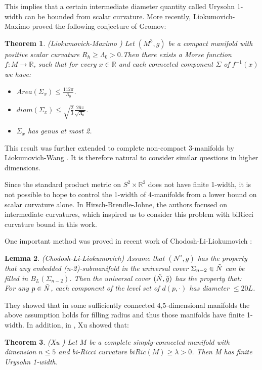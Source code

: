 \documentclass{amsart}
\newtheorem{theorem}{Theorem}[section]
\newtheorem{lemma}[theorem]{Lemma}
\theoremstyle{definition}
\theoremstyle{remark}
\numberwithin{equation}{section}
\begin{document}
This implies that a certain intermediate diameter quantity called Urysohn 1-width can be bounded from scalar curvature. More recently, Liokumovich-Maximo \cite {Yd20} proved the following conjecture of Gromov:

\begin{theorem}(Liokumovich-Maximo \cite{Yd20})
    Let $(M^{3},g)$ be a compact manifold with positive scalar curvature $R_{h}\geq\Lambda_{0}>0$.Then there exists a Morse function $f:M\to \mathbb{R}$, such that for every $x\in \mathbb{R}$ and each connected component $\Sigma$ of $f^{-1}(x)$ we have:
\begin{itemize}
    \item[(a)] $Area(\Sigma_{x})\leq \frac{112\pi}{\Lambda_{0}}$.
    \item[(b)] $diam(\Sigma_{x})\leq \sqrt{\frac{2}{3}}\frac{26\pi}{\sqrt{\Lambda_{0}}}$.

    \item[(c)] $\Sigma_{x}$ has genus at most 2. 
\end{itemize}

\end{theorem}
This result was further extended to complete non-compact 3-manifolds by Lioku\-movich-Wang \cite{lw23}. It is therefore natural to consider  similar questions in higher dimensions.

Since the standard product metric on $S^{2}\times \mathbb{R}^{2}$ does not have finite 1-width, it is not possible to hope to control the 1-width of 4-manifolds from a lower bound on scalar curvature alone. In Hirsch-Brendle-Johne\cite{ssa22}, the authors focused on intermediate curvatures, which inspired us to consider this problem with biRicci curvature bound in this work. 

One important method was proved in recent work of Chodosh-Li-Liokumovich \cite{cll23} :
\begin{lemma}(Chodosh-Li-Liokumovich\cite{cll23})
Assume that $(N^{n},g)$ has the property that any embedded (n-2)-submanifold in the universal cover $\Sigma_{n-2}\in \Tilde{N}$ can be filled in $B_{L}(\Sigma_{n-2})$. Then the universal cover $(\Tilde{N},\Tilde{g})$ has the property that:\\
For any $p\in \Tilde{N}$, each component of the level set of $d(p,\cdot)$ has diameter $\leq 20L$.
\end{lemma}

They showed that in some sufficiently connected 4,5-dimensional manifolds the above assumption holds for filling radius and thus those manifolds have finite 1-width. In addition, in \cite{x23}, Xu showed that:
\begin{theorem} (Xu \cite{x23})
    Let $M$ be a complete simply-connected manifold with dimension $n \leq5$ and bi-Ricci curvature $biRic(M) \geq \lambda > 0$. Then M has finite Urysohn 1-width.
\end{theorem}
\end{document}
